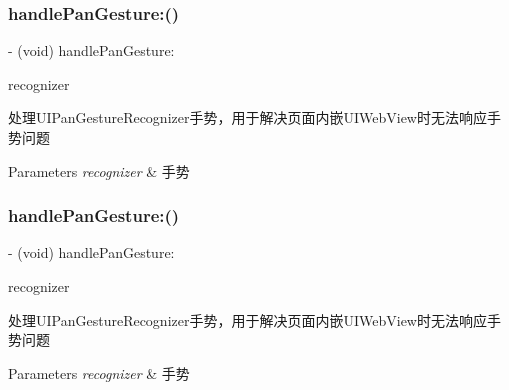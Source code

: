 \subsubsection{\texorpdfstring{handle\+Pan\+Gesture\+:()}{handlePanGesture:()}\hspace{0.1cm}{\footnotesize\ttfamily [2/3]}}
{\footnotesize\ttfamily -\/ (void) handle\+Pan\+Gesture\+: \begin{DoxyParamCaption}\item[{(U\+I\+Pan\+Gesture\+Recognizer $\ast$)}]{recognizer }\end{DoxyParamCaption}}

处理\+U\+I\+Pan\+Gesture\+Recognizer手势，用于解决页面内嵌\+U\+I\+Web\+View时无法响应手势问题


\begin{DoxyParams}{Parameters}
{\em recognizer} & 手势 \\
\hline
\end{DoxyParams}
\mbox{\label{interface_v_t_magic_view_a3c17ac83f0b9c1bf684852d60d3f4766}} 
\subsubsection{\texorpdfstring{handle\+Pan\+Gesture\+:()}{handlePanGesture:()}\hspace{0.1cm}{\footnotesize\ttfamily [3/3]}}
{\footnotesize\ttfamily -\/ (void) handle\+Pan\+Gesture\+: \begin{DoxyParamCaption}\item[{(U\+I\+Pan\+Gesture\+Recognizer $\ast$)}]{recognizer }\end{DoxyParamCaption}}

处理\+U\+I\+Pan\+Gesture\+Recognizer手势，用于解决页面内嵌\+U\+I\+Web\+View时无法响应手势问题


\begin{DoxyParams}{Parameters}
{\em recognizer} & 手势 \\
\hline
\end{DoxyParams}
\mbox{\label{interface_v_t_magic_view_a865a894c24bdce6783fd3bd8d9152400}} 
